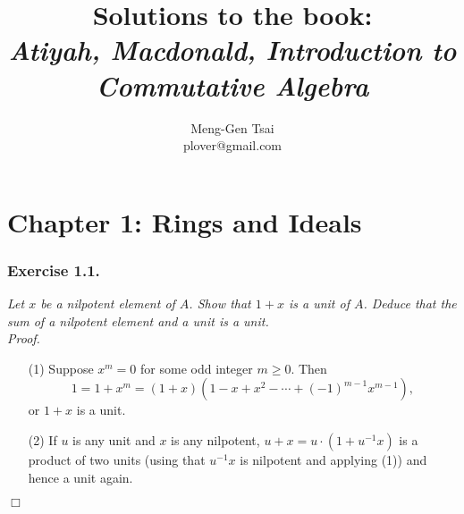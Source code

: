\documentclass{article}
\title{\textbf{Solutions to the book: \\
\emph{Atiyah, Macdonald, Introduction to Commutative Algebra}}}
\author{Meng-Gen Tsai \\ plover@gmail.com}
\begin{document}
\maketitle
\tableofcontents












\newpage
\section*{Chapter 1: Rings and Ideals \\}



\subsubsection*{Exercise 1.1.}
\emph{Let $x$ be a nilpotent element of $A$.
Show that $1+x$ is a unit of $A$.
Deduce that the sum of a nilpotent element and a unit is a unit.} \\



\emph{Proof.}
\begin{enumerate}
\item[(1)]
  Suppose $x^m = 0$ for some odd integer $m \geq 0$.
  Then
  \[
    1 = 1+x^m = (1+x)(1-x+x^2-\cdots+(-1)^{m-1}x^{m-1}),
  \]
  or $1+x$ is a unit.

\item[(2)]
  If $u$ is any unit and $x$ is any nilpotent,
  $u + x= u \cdot (1 + u^{-1}x)$ is a product of two units
  (using that $u^{-1}x$ is nilpotent and applying (1))
  and hence a unit again.
\end{enumerate}
$\Box$ \\
\end{document}
